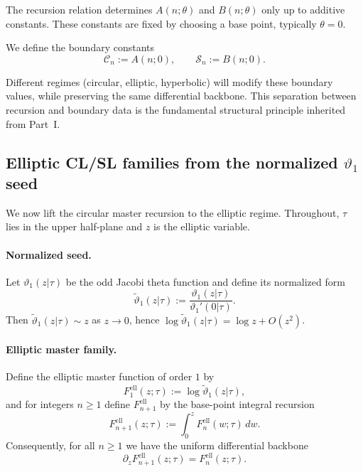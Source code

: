 \documentclass[11pt]{article}
\begin{document}
The recursion relation determines $A(n;\theta)$ and $B(n;\theta)$
only up to additive constants.
These constants are fixed by choosing a base point,
typically $\theta=0$.

We define the boundary constants
\[
\mathcal{C}_n := A(n;0),
\qquad
\mathcal{S}_n := B(n;0).
\]

Different regimes (circular, elliptic, hyperbolic)
will modify these boundary values,
while preserving the same differential backbone.
This separation between recursion and boundary data
is the fundamental structural principle inherited
from Part~I.


\subsection{Elliptic CL/SL families from the normalized $\vartheta_1$ seed}

We now lift the circular master recursion to the elliptic regime.
Throughout, $\tau$ lies in the upper half-plane and $z$ is the elliptic variable.

\paragraph{Normalized seed.}
Let $\vartheta_1(z|\tau)$ be the odd Jacobi theta function and define its normalized form
\begin{equation}\label{eq:theta1-normalized}
\widetilde{\vartheta}_1(z|\tau)
:=\frac{\vartheta_1(z|\tau)}{\vartheta_1'(0|\tau)}.
\end{equation}
Then $\widetilde{\vartheta}_1(z|\tau)\sim z$ as $z\to 0$, hence
$\log \widetilde{\vartheta}_1(z|\tau)=\log z + O(z^2)$.

\paragraph{Elliptic master family.}
Define the elliptic master function of order $1$ by
\begin{equation}\label{eq:ell-master-seed}
F^{\mathrm{ell}}_1(z;\tau):=\log \widetilde{\vartheta}_1(z|\tau),
\end{equation}
and for integers $n\ge1$ define $F^{\mathrm{ell}}_{n+1}$ by the base-point integral recursion
\begin{equation}\label{eq:ell-master-recursion}
F^{\mathrm{ell}}_{n+1}(z;\tau):=\int_{0}^{z} F^{\mathrm{ell}}_{n}(w;\tau)\,dw.
\end{equation}
Consequently, for all $n\ge1$ we have the uniform differential backbone
\begin{equation}\label{eq:ell-backbone}
\partial_z F^{\mathrm{ell}}_{n+1}(z;\tau)=F^{\mathrm{ell}}_{n}(z;\tau).
\end{equation}
\end{document}
